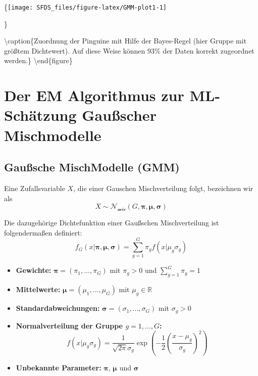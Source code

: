 \documentclass[
]{book}
\providecommand{\tightlist}{%
  \setlength{\itemsep}{0pt}\setlength{\parskip}{0pt}}
\begin{document}
\{\centering \texttt{[image: SFDS\_files/figure-latex/GMM-plot1-1]}

\}

\textbackslash caption\{Zuordnung der Pinguine mit Hilfe der Bayes-Regel (hier Gruppe mit größtem Dichtewert). Auf diese Weise können 93\% der Daten korrekt zugeordnet werden.\}\label{fig:GMM-plot1}
\textbackslash end\{figure\}

\hypertarget{der-em-algorithmus-zur-ml-schuxe4tzung-gauuxdfscher-mischmodelle}{%
\section{Der EM Algorithmus zur ML-Schätzung Gaußscher Mischmodelle}\label{der-em-algorithmus-zur-ml-schuxe4tzung-gauuxdfscher-mischmodelle}}

\hypertarget{gauuxdfsche-mischmodelle-gmm}{%
\subsection{Gaußsche MischModelle (GMM)}\label{gauuxdfsche-mischmodelle-gmm}}

Eine Zufallsvariable \(X\), die einer Gauschen Mischverteilung folgt, bezeichnen wir als
\[
X\sim\mathcal{N}_{\mathcal{mix}}(G,\boldsymbol{\pi},\boldsymbol{\mu},\boldsymbol{\sigma})
\]

Die dazugehörige Dichtefunktion einer Gaußschen Mischverteilung ist folgendermaßen definiert:
\[
f_G(x|\boldsymbol{\pi},\boldsymbol{\mu},\boldsymbol{\sigma})=\sum_{g=1}^G\pi_gf(x|\mu_g\sigma_g)
\]

\begin{itemize}
\tightlist
\item
  \textbf{Gewichte:} \(\boldsymbol{\pi}=(\pi_1,\dots,\pi_G)\) mit \(\pi_g>0\) und \(\sum_{g=1}^G\pi_g=1\)
\item
  \textbf{Mittelwerte:} \(\boldsymbol{\mu}=(\mu_1,\dots,\mu_G)\) mit \(\mu_g\in\mathbb{R}\)
\item
  \textbf{Standardabweichungen:} \(\boldsymbol{\sigma}=(\sigma_1,\dots,\sigma_G)\) mit \(\sigma_g>0\)
\item
  \textbf{Normalverteilung der Gruppe \(g=1,\dots,G\):}
  \[
  f(x|\mu_g\sigma_g)=\frac{1}{\sqrt{2\pi}\sigma_g}\exp\left(-\frac{1}{2}\left(\frac{x-\mu_g}{\sigma_g}\right)^2\right)
  \]
\item
  \textbf{Unbekannte Parameter:} {\(\boldsymbol{\pi}\)}, {\(\boldsymbol{\mu}\)} und {\(\boldsymbol{\sigma}\)}
\end{itemize}
\end{document}

